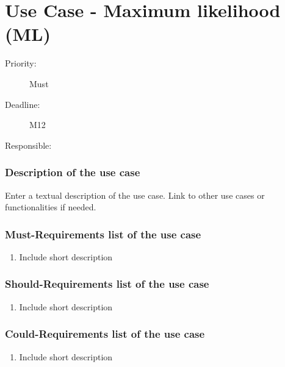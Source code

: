 \newpage
\section{Use Case - Maximum likelihood (ML)}
\label{UseCase:ML}

\begin{description}
\item[Priority:] Must
\item[Deadline:] M12
\item[Responsible:]
\end{description}

\subsubsection*{Description of the use case}

Enter a textual description of the use case. Link to other use cases or functionalities if needed. 

\subsubsection*{Must-Requirements list of the use case}

\begin{enumerate}
\item Include short description
\end{enumerate}

\subsubsection*{Should-Requirements list of the use case}

\begin{enumerate}
\item Include short description
\end{enumerate}

\subsubsection*{Could-Requirements list of the use case}

\begin{enumerate}
\item Include short description
\end{enumerate}


